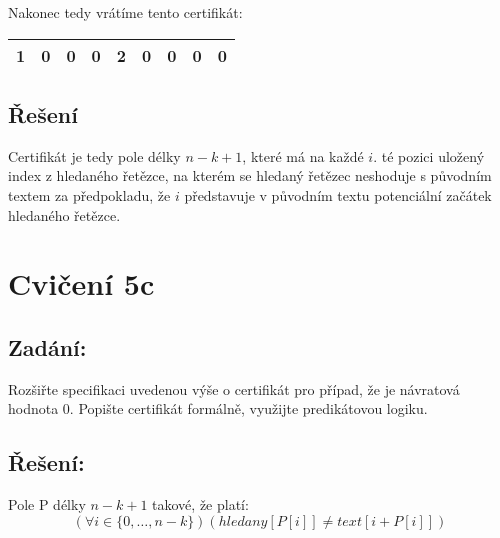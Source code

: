 \documentclass{article}
\begin{document}
Nakonec tedy vrátíme tento certifikát:

\begin{table}[H]\centering

\begin{tabular}{|c|c|c|c|c|c|c|c|c|}
        \hline 1 & 0 & 0 & 0 & 2 & 0 & 0 & 0 & 0 \\ \hline
    	\end{tabular}
\end{table}

\subsection{Řešení}

Certifikát je tedy pole délky $n-k+1$, které má na každé $i$. té pozici uložený index z hledaného řetězce, na kterém se hledaný řetězec neshoduje s původním textem za předpokladu, že $i$ představuje v původním textu potenciální začátek hledaného řetězce.

\section{Cvičení 5c}

\subsection{Zadání:}

Rozšiřte specifikaci uvedenou výše o certifikát pro případ, že je návratová hodnota 0. Popište certifikát formálně, využijte predikátovou logiku.

\subsection{Řešení:}

Pole P délky $n - k + 1$  takové, že platí:
$$(\forall i \in \{0,\dots,n-k\})(hledany[P[i]] \neq text[i+P[i]])$$
\end{document}
